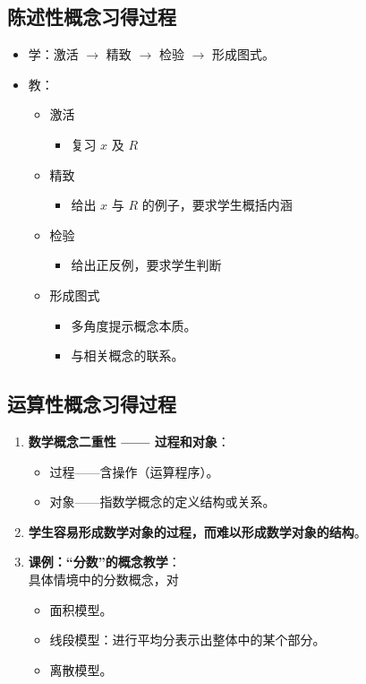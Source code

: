 \begin{multicols}{2}
\subsection*{陈述性概念习得过程}
\begin{itemize}
    \item 学：激活 $\rightarrow$ 精致 $\rightarrow$ 检验 $\rightarrow$ 形成图式。
    \item 教：
    \begin{itemize}
        \item 激活
        \begin{itemize}
            \item 复习 $x$ 及 $R$
        \end{itemize}
        \item 精致
        \begin{itemize}
            \item 给出 $x$ 与 $R$ 的例子，要求学生概括内涵
        \end{itemize}
        \item 检验
        \begin{itemize}
            \item 给出正反例，要求学生判断
        \end{itemize}
        \item 形成图式
        \begin{itemize}
            \item 多角度提示概念本质。
            \item 与相关概念的联系。 
        \end{itemize}
    \end{itemize}
\end{itemize}
\columnbreak
\subsection*{运算性概念习得过程}
\begin{enumerate}
    \item \textbf{数学概念二重性 —— 过程和对象}：
    \begin{itemize}
        \item 过程——含操作（运算程序）。
        \item 对象——指数学概念的定义结构或关系。
    \end{itemize}
    \item \textbf{学生容易形成数学对象的过程，而难以形成数学对象的结构}。
    \item \textbf{课例：“分数”的概念教学}：\\
    具体情境中的分数概念，对
    \begin{itemize}
        \item 面积模型。
        \item 线段模型：进行平均分表示出整体中的某个部分。
        \item 离散模型。
    \end{itemize}
\end{enumerate}
\end{multicols}

